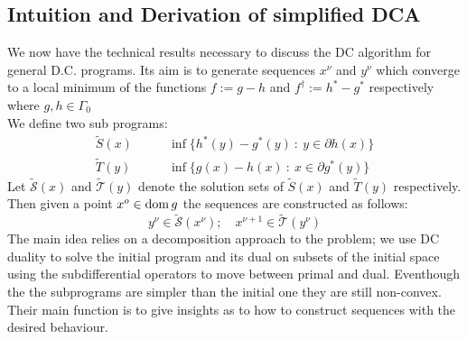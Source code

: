 \newcommand{\xs}{x^\nu}
\newcommand{\xss}{x^{\nu+1}}
\newcommand{\ys}{y^{\nu}}
\newcommand{\yss}{y^{\nu+1}}
\subsection{Intuition and Derivation of simplified DCA}
We now have the technical results necessary to discuss the
DC algorithm for general D.C. programs. Its aim is to 
generate sequences $x^\nu$ and $y^\nu$ which converge to a local
minimum of the functions $f:=g-h$ and $f^\dagger:= h^*-g^*$
respectively where $g,h\in\Gamma_0$\\ We define two sub programs:
\begin{align} 
 \widetilde S(x) \qquad &\inf\{h^*(y)-g^*(y) \ : \ y\in\partial h(x)\}\\ 
 \widetilde T(y) \qquad &\inf\{g(x)-h(x) \ : \ x\in\partial g^*(y)\}
 \label{fulldca}
\end{align}
Let $\widetilde {\mathcal S}(x)$ and $\widetilde{\mathcal T}(y)$ denote the
solution sets of $\widetilde S(x)$ and $\widetilde T(y)$ respectively. Then given
a point $x^o\in\mathrm{dom} \, g$
the sequences are constructed as follows:
\begin{equation}
  \ys\in\widetilde{\mathcal S}(\xs); \quad \xss\in\widetilde{\mathcal T}(\ys)
\end{equation}
The main idea relies on a decomposition approach to the problem;
we use DC duality to solve the initial program and its dual
on subsets of the initial space using the subdifferential
operators to move between primal and dual. Eventhough the 
the subprograms are simpler than the initial one they are 
still non-convex. Their main function is to give 
insights as to how to construct sequences with the desired
behaviour. \\

